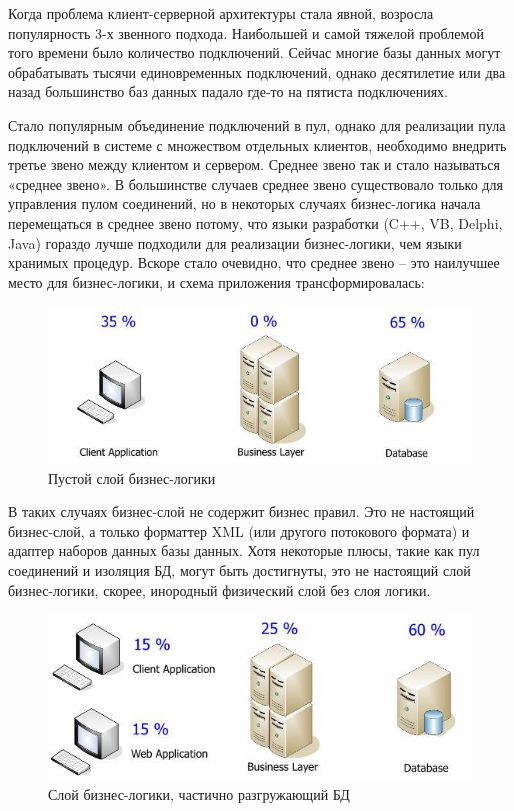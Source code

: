 \documentclass[a4paper, 14pt]{extarticle}
\begin{document}
Когда проблема клиент-серверной архитектуры стала явной, возросла популярность 3-х звенного подхода. Наибольшей и самой тяжелой проблемой того времени было количество подключений. Сейчас многие базы данных могут обрабатывать тысячи единовременных подключений, однако десятилетие или два назад большинство баз данных падало где-то на пятиста подключениях.

Стало популярным объединение подключений в пул, однако для реализации пула подключений в системе с множеством отдельных клиентов, необходимо внедрить третье звено между клиентом и сервером. Среднее звено так и стало называться «среднее звено». В большинстве случаев среднее звено существовало только для управления пулом соединений, но в некоторых случаях бизнес-логика начала перемещаться в среднее звено потому, что языки разработки (C++, VB, Delphi, Java) гораздо лучше подходили для реализации бизнес-логики, чем языки хранимых процедур. Вскоре стало очевидно, что среднее звено -- это наилучшее место для бизнес-логики, и схема приложения трансформировалась:

\begin{figure}[!htb]
  \centering
    \includegraphics[scale=0.6]{../shared_images/business-logic/client-server-business.jpg}
   \caption{Пустой слой бизнес-логики}
    \label{fig:start}
\end{figure}

В таких случаях бизнес-слой не содержит бизнес правил. Это не настоящий бизнес-слой, а только форматтер XML (или другого потокового формата) и адаптер наборов данных базы данных. Хотя некоторые плюсы, такие как пул соединений и изоляция БД, могут быть достигнуты, это не настоящий слой бизнес-логики, скорее, инородный физический слой без слоя логики.

\begin{figure}[!htb]
  \centering
    \includegraphics[scale=0.6]{../shared_images/business-logic/client-server-business-2.jpg}
   \caption{Слой бизнес-логики, частично разгружающий БД}
    \label{fig:start}
\end{figure}
\end{document}
